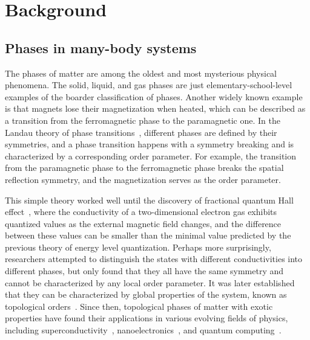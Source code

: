 \chapter{Background}

\section{Phases in many-body systems}

The phases of matter are among the oldest and most mysterious physical phenomena. The solid, liquid, and gas phases are just elementary-school-level examples of the boarder classification of phases. Another widely known example is that magnets lose their magnetization when heated, which can be described as a transition from the ferromagnetic phase to the paramagnetic one. In the Landau theory of phase transitions~\cite{landau1937theory}, different phases are defined by their symmetries, and a phase transition happens with a symmetry breaking and is characterized by a corresponding order parameter. For example, the transition from the paramagnetic phase to the ferromagnetic phase breaks the spatial reflection symmetry, and the magnetization serves as the order parameter.

This simple theory worked well until the discovery of fractional quantum Hall effect~\cite{tsui1982two}, where the conductivity of a two-dimensional electron gas exhibits quantized values as the external magnetic field changes, and the difference between these values can be smaller than the minimal value predicted by the previous theory of energy level quantization. Perhaps more surprisingly, researchers attempted to distinguish the states with different conductivities into different phases, but only found that they all have the same symmetry and cannot be characterized by any local order parameter. It was later established that they can be characterized by global properties of the system, known as topological orders~\cite{wen1990ground}. Since then, topological phases of matter with exotic properties have found their applications in various evolving fields of physics, including superconductivity~\cite{hansson2004superconductors}, nanoelectronics~\cite{gilbert2021topological}, and quantum computing~\cite{kitaev2003fault}.

